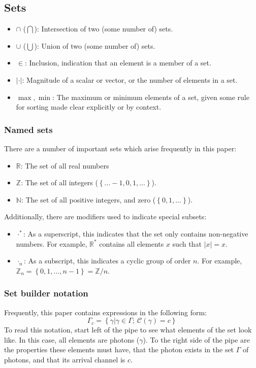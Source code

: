 \documentclass{article}
\newcommand{\braces}[1]{\ensuremath{\left\lbrace #1 \right\rbrace}}
\newcommand{\integers}{\ensuremath{\mathbb{Z}}}
\newcommand{\wholes}{\ensuremath{\mathbb{N}}}
\newcommand{\reals}{\ensuremath{\mathbb{R}}}
\newcommand{\abs}[1]{\ensuremath{\left|#1\right|}}
\newcommand{\channel}{\ensuremath{c}}
\newcommand{\Channel}{\ensuremath{\mathcal{C}}}
\newcommand{\photon}{\ensuremath{\gamma}}
\newcommand{\photons}{\ensuremath{\Gamma}}
\begin{document}
\begin{appendix}
\subsection{Sets}
\begin{itemize}
\item $\cap$ ($\bigcap$): Intersection of two (some number of) sets.
\item $\cup$ ($\bigcup$): Union of two (some number of) sets.
\item $\in$: Inclusion, indication that an element is a member of a set.
\item $\abs{\cdot}$: Magnitude of a scalar or vector, or the number of elements in a set.
\item $\max,\min$: The maximum or minimum elements of a set, given some rule for sorting made clear explicitly or by context.
\end{itemize}

\subsubsection{Named sets}
There are a number of important sets which arise frequently in this paper:
\begin{itemize}
\item \reals: The set of all real numbers
\item \integers: The set of all integers (\braces{\ldots-1,0,1,\ldots}).
\item \wholes: The set of all positive integers, and zero (\braces{0,1,\ldots}).
\end{itemize}
Additionally, there are modifiers used to indicate special subsets:
\begin{itemize}
\item $\cdot^{*}$: As a superscript, this indicates that the set only contains non-negative numbers. For example, $\reals^{*}$ contains all elements $x$ such that $\abs{x}=x$.
\item $\cdot_{n}$: As a subscript, this indicates a cyclic group of order $n$. For example, $\integers_{n}=\braces{0,1,\ldots,n-1}=\integers/n$. 
\end{itemize}

\subsubsection{Set builder notation}
Frequently, this paper contains expressions in the following form:
\begin{equation}
\photons_{\channel}=\braces{\photon\left|\photon\in\photons;~\Channel(\photon)=\channel\right.}
\end{equation}
To read this notation, start left of the pipe to see what elements of the set look like. In this case, all elements are photons (\photon). To the right side of the pipe are the properties these elements must have, that the photon exists in the set \photons{} of photons, and that its arrival channel is $c$. 


\end{appendix}
\end{document}
